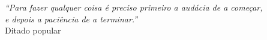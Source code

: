\cleardoublepage
\thispagestyle{plain}

\vspace*{8cm}

\begin{flushright}
    \textsl{``Para fazer qualquer coisa é preciso primeiro a audácia de a começar,\\
    e depois a paciência de a terminar.''\\}
    \vspace*{1.5cm}
    Ditado popular
\end{flushright}










